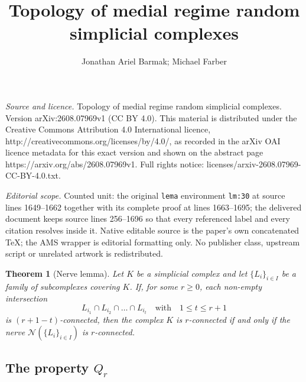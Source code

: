 \documentclass[10pt,a4paper]{amsart}
\newtheorem{teo}[lema]{Theorem}
\newcommand{\st}{\textrm{st}}
\begin{document}
\title[Topology of medial regime random simplicial complexes]{Topology of medial regime random simplicial complexes}
\author{Jonathan Ariel Barmak; Michael Farber}
\date{}
\maketitle
\noindent\emph{Source and licence.} Topology of medial regime random simplicial complexes. Version arXiv:2608.07969v1 (CC BY 4.0). This material is distributed under the Creative Commons Attribution 4.0 International licence, http://creativecommons.org/licenses/by/4.0/, as recorded in the arXiv OAI licence metadata for this exact version and shown on the abstract page https://arxiv.org/abs/2608.07969v1. Full rights notice: licenses/arxiv-2608.07969-CC-BY-4.0.txt.\par\smallskip
\noindent\textit{Editorial scope.} Counted unit: the original \texttt{lema} environment \texttt{lm:30} at source lines 1649--1662 together with its complete proof at lines 1663--1695; the delivered document keeps source lines 256--1696 so that every referenced label and every citation resolves inside it. Native editable source is the paper's own concatenated TeX; the AMS wrapper is editorial formatting only. No publisher class, upstream script or unrelated artwork is redistributed.
\begin{teo}[Nerve lemma] \label{nerv}
Let $K$ be a simplicial complex and let $\{L_i\}_{i\in I}$ be a family of subcomplexes covering $K$. If, for some $r\ge 0$, each non-empty intersection 
$$L_{i_1}\cap L_{i_2} \cap \ldots \cap L_{i_t}\quad \mbox{with}\quad  1\le t\le r+1$$ is $(r+1-t)$-connected, then the complex $K$ is $r$-connected if and only if the nerve $\mathcal{N}(\{L_i\}_{i\in I})$ is $r$-connected.
\end{teo}  

  \subsection{The property $Q_r$}

\end{document}
